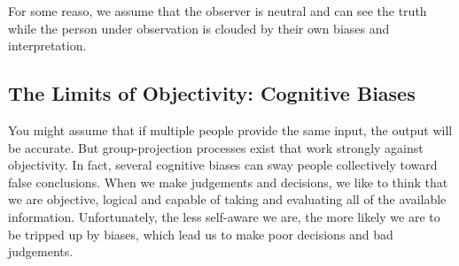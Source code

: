 \documentclass[ebook,12pt,oneside,openany]{memoir}
\begin{document}
For some reaso, we assume that the observer is neutral and can see the truth while the person under observation is clouded by their own biases and interpretation.

\subsection{The Limits of Objectivity: Cognitive Biases}
You might assume that if multiple people provide the same input, the output will be accurate. But group-projection processes exist that work strongly against objectivity. In fact, several cognitive biases can sway people collectively toward false conclusions.
When we make judgements and decisions, we like to think that we are objective, logical and capable of taking and evaluating all of the available information. Unfortunately, the less self-aware we are, the more likely we are to be tripped up by biases, which lead us to make poor decisions and bad judgements.
\end{document}
